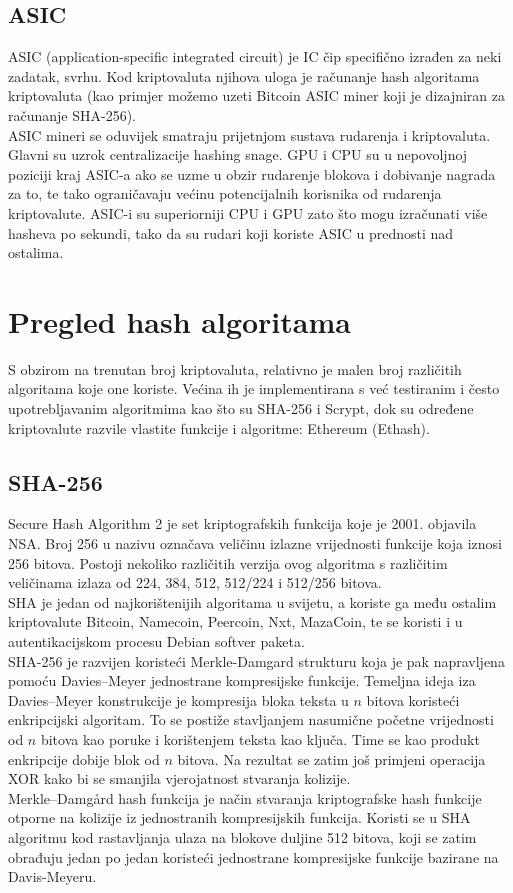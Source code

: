 \documentclass[12pt]{article}
\begin{document}
\subsection{ASIC}
ASIC (application-specific integrated circuit) je IC čip specifično izrađen za neki zadatak, svrhu. Kod kriptovaluta njihova uloga je računanje hash algoritama kriptovaluta (kao primjer možemo uzeti Bitcoin ASIC miner koji je dizajniran za računanje SHA-256). \\
ASIC mineri se oduvijek smatraju prijetnjom sustava rudarenja i kriptovaluta. Glavni su uzrok centralizacije hashing snage. GPU i CPU su u nepovoljnoj poziciji kraj ASIC-a ako se uzme u obzir rudarenje blokova i dobivanje nagrada za to, te tako ograničavaju većinu potencijalnih korisnika od rudarenja kriptovalute. 
ASIC-i su superiorniji CPU i GPU zato što mogu izračunati više hasheva po sekundi, tako da su rudari koji koriste ASIC u prednosti nad ostalima.\cite{asic}\\

\pagebreak
\section{Pregled hash algoritama}
S obzirom na trenutan broj kriptovaluta, relativno je malen broj različitih algoritama koje one koriste. Većina ih je implementirana s već testiranim i često upotrebljavanim algoritmima kao što su SHA-256 i Scrypt, dok su određene kriptovalute razvile vlastite funkcije i algoritme: Ethereum (Ethash).


\subsection{SHA-256}
Secure Hash Algorithm 2 je set kriptografskih funkcija koje je 2001. objavila NSA. Broj 256 u nazivu označava veličinu izlazne vrijednosti funkcije koja iznosi 256 bitova. Postoji nekoliko različitih verzija ovog algoritma s različitim veličinama izlaza od 224, 384, 512, 512/224 i 512/256 bitova. \\
SHA je jedan od najkorištenijih algoritama u svijetu, a koriste ga među ostalim kriptovalute Bitcoin, Namecoin, Peercoin, Nxt, MazaCoin, te se koristi i u autentikacijskom procesu Debian softver paketa. \\

SHA-256 je razvijen koristeći Merkle-Damgard strukturu koja je pak napravljena pomoću Davies–Meyer jednostrane kompresijske funkcije. Temeljna ideja iza Davies–Meyer konstrukcije je kompresija bloka teksta u $n$ bitova koristeći enkripcijski algoritam. To se postiže stavljanjem nasumične početne vrijednosti od $n$ bitova kao poruke i korištenjem teksta kao ključa. Time se kao produkt enkripcije dobije blok od $n$ bitova. Na rezultat se zatim još primjeni operacija XOR kako bi se smanjila vjerojatnost stvaranja kolizije. \\
Merkle–Damgård hash funkcija je način stvaranja kriptografske hash funkcije otporne na kolizije iz jednostranih kompresijskih funkcija. Koristi se u SHA algoritmu kod rastavljanja ulaza na blokove duljine 512 bitova, koji se zatim obrađuju jedan po jedan koristeći jednostrane kompresijske funkcije bazirane na Davis-Meyeru.
\end{document}
